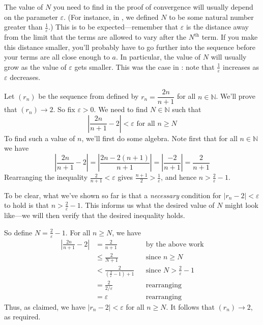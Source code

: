 \begin{remark}
The value of $N$ you need to find in the proof of convergence will usually depend on the parameter $\varepsilon$. (For instance, in , we defined $N$ to be some natural number greater than $\frac{1}{\varepsilon}$.) This is to be expected---remember that $\varepsilon$ is the distance away from the limit that the terms are allowed to vary after the $N^{\text{th}}$ term. If you make this distance smaller, you'll probably have to go further into the sequence before your terms are all close enough to $a$. In particular, the value of $N$ will usually grow as the value of $\varepsilon$ gets smaller. This was the case in : note that $\frac{1}{\varepsilon}$ increases as $\varepsilon$ decreases.
\end{remark}

\begin{example}
\label{exTwoNOverNPlusOneConvergence}
Let $(r_n)$ be the sequence from  defined by $r_n = \dfrac{2n}{n+1}$ for all $n \in \mathbb{N}$. We'll prove that $(r_n) \to 2$. So fix $\varepsilon > 0$. We need to find $N \in \mathbb{N}$ such that
\[ \left| \frac{2n}{n+1} - 2 \right| < \varepsilon \text{ for all } n \ge N \]
To find such a value of $n$, we'll first do some algebra. Note first that for all $n \in \mathbb{N}$ we have
\[ \left| \frac{2n}{n+1} - 2 \right| = \left| \frac{2n-2(n+1)}{n+1} \right| = \left| \frac{-2}{n+1} \right| = \frac{2}{n+1} \]
Rearranging the inequality $\frac{2}{n+1} < \varepsilon$ gives $\frac{n+1}{2} > \frac{1}{\varepsilon}$, and hence $n > \frac{2}{\varepsilon} - 1$.

To be clear, what we've shown so far is that a \textit{necessary} condition for $|r_n-2|<\varepsilon$ to hold is that $n>\frac{2}{\varepsilon}-1$. This informs us what the desired value of $N$ might look like---we will then verify that the desired inequality holds.

So define $N=\frac{2}{\varepsilon}-1$. For all $n \ge N$, we have
\begin{align*}
\left| \frac{2n}{n+1} - 2 \right|
&= \frac{2}{n+1} && \text{by the above work} \\
&\le \frac{2}{N+1} && \text{since $n \ge N$} \\
&< \frac{2}{\left(\frac{2}{\varepsilon}-1\right) + 1} && \text{since $N>\frac{2}{\varepsilon}-1$} \\
&= \frac{2}{2/\varepsilon} && \text{rearranging} \\
&= \varepsilon && \text{rearranging}
\end{align*}
Thus, as claimed, we have $|r_n-2|<\varepsilon$ for all $n \ge N$. It follows that $(r_n) \to 2$, as required.
\end{example}

